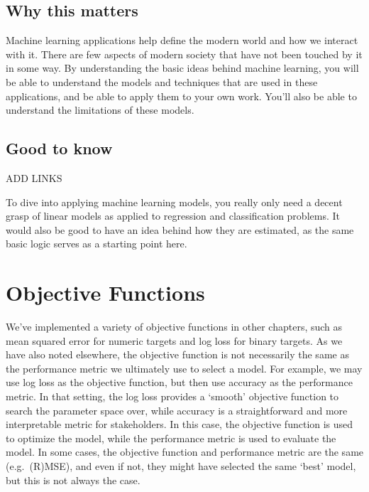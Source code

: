 \documentclass[
  letterpaper,
]{krantz}
\begin{document}
\subsection{Why this matters}\label{why-this-matters}

Machine learning applications help define the modern world and how we
interact with it. There are few aspects of modern society that have not
been touched by it in some way. By understanding the basic ideas behind
machine learning, you will be able to understand the models and
techniques that are used in these applications, and be able to apply
them to your own work. You'll also be able to understand the limitations
of these models.

\subsection{Good to know}\label{good-to-know}

ADD LINKS

To dive into applying machine learning models, you really only need a
decent grasp of linear models as applied to regression and
classification problems. It would also be good to have an idea behind
how they are estimated, as the same basic logic serves as a starting
point here.

\section{Objective Functions}\label{sec-ml-objective}

We've implemented a variety of objective functions in other chapters,
such as mean squared error for numeric targets and log loss for binary
targets. As we have also noted elsewhere, the objective function is not
necessarily the same as the performance metric we ultimately use to
select a model. For example, we may use log loss as the objective
function, but then use accuracy as the performance metric. In that
setting, the log loss provides a `smooth' objective function to search
the parameter space over, while accuracy is a straightforward and more
interpretable metric for stakeholders. In this case, the objective
function is used to optimize the model, while the performance metric is
used to evaluate the model. In some cases, the objective function and
performance metric are the same (e.g.~(R)MSE), and even if not, they
might have selected the same `best' model, but this is not always the
case.
\end{document}
